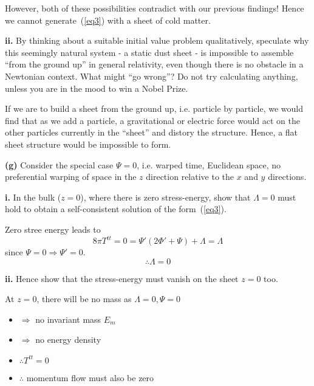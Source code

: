 \documentclass[a4paper]{article} %
\begin{document}
However, both of these possibilities contradict with our previous findings! Hence we cannot generate~(\ref{eq3}) with a sheet of cold matter.


\begin{framed}
\textbf{ii.} By thinking about a suitable initial value problem qualitatively, speculate why this seemingly natural system - a static dust sheet - is impossible to assemble ``from the ground up'' in general relativity, even though there is no obstacle in a Newtonian context. What might ``go wrong''? Do not try calculating anything, unless you are in the mood to win a Nobel Prize.
\end{framed}

If we are to build a sheet from the ground up, i.e. particle by particle, we would find that as we add a particle, a gravitational or electric force would act on the other particles currently in the ``sheet'' and distory the structure. Hence, a flat sheet structure would be impossible to form.


\begin{framed}
\textbf{(g)} Consider the special case $\Psi=0$, i.e. warped time, Euclidean space, no preferential
warping of space in the $z$ direction relative to the $x$ and $y$ directions.
\end{framed}

\begin{framed}
\textbf{i.} In the bulk ($z=0$), where there is zero stress-energy, show that $\Lambda=0$ must
hold to obtain a self-consistent solution of the form~(\ref{eq3}).
\end{framed}

Zero stree energy leads to
\begin{equation}
8\pi T^{tt}=0=\Psi'(2\Phi' + \Psi) + \Lambda = \Lambda
\end{equation}
since $\Psi=0\Rightarrow \Psi'=0$.
\begin{equation}
\therefore \Lambda = 0
\end{equation}


\begin{framed}
\textbf{ii.} Hence show that the stress-energy must vanish on the sheet $z = 0$ too.
\end{framed}

At $z=0$, there will be no mass as $\Lambda=0,\Psi=0$
\begin{itemize}
\item[] $\Rightarrow$ no invariant mass $E_{m}$
\item[] $\Rightarrow$ no energy density
\item[] $\therefore T^{tt}=0$
\item[] $\therefore$ momentum flow must also be zero
\end{itemize}
\end{document}
